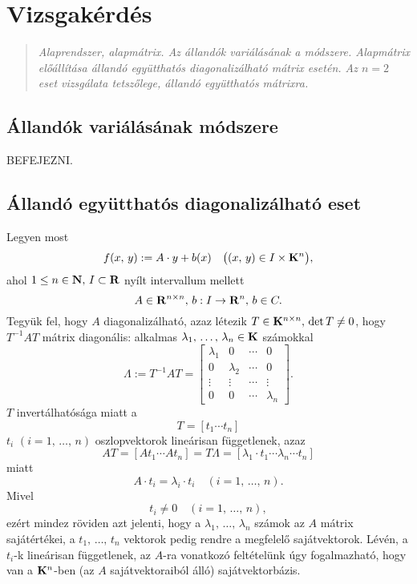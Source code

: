 \newpage
\section{Vizsgakérdés}
\begin{quote}
	\textit{Alaprendszer, alapmátrix. Az állandók variálásának a módszere. Alapmátrix előállítása állandó együtthatós diagonalizálható mátrix esetén. Az $n=2$ eset vizsgálata tetszőlege, állandó együtthatós mátrixra.}
\end{quote}

\subsection{Állandók variálásának módszere}
BEFEJEZNI.

\subsection{Állandó együtthatós diagonalizálható eset}

Legyen most
\[
f(x, \, y) := A \cdot y + b(x) \quad \big( (x, \, y) \in I \times \mathbf{K}^n \big),
\]
ahol $1 \leq n \in \mathbf{N}, \, I \subset \mathbf{R}$ nyílt intervallum mellett
\[
A \in \mathbf{R}^{n \times n}, \, b : I \to \mathbf{R}^n, \, b \in C.
\]
Tegyük fel, hogy $A$ diagonalizálható, azaz létezik $T \in \mathbf{K}^{n \times n}, \, \det T \neq 0$, hogy $T^{-1}AT$ mátrix diagonális: alkalmas $\lambda_1, \, \dots, \, \lambda_n \in \mathbf{K}$ számokkal
\[
\Lambda := T^{-1}AT = \begin{bmatrix}
	\lambda_1 & 0 & \cdots & 0 \\
	0 & \lambda_2 & \cdots & 0 \\
	\vdots & \vdots & \cdots & \vdots \\
	0 & 0 & \cdots & \lambda_n
\end{bmatrix}.
\]
$T$ invertálhatósága miatt a
\[
T = [t_1 \cdots t_n]
\]
$t_i$ $(i=1, \, \dots, \, n)$ oszlopvektorok lineárisan függetlenek, azaz
\[
AT = [At_1 \cdots At_n] = T\Lambda = [\lambda_1 \cdot t_1 \cdots \lambda_n \cdots t_n]
\]
miatt
\[
A \cdot t_i = \lambda_i \cdot t_i \quad (i = 1, \, \dots, \, n).
\]
Mivel
\[
t_i \neq 0 \quad (i = 1, \, \dots, \, n),
\]
ezért mindez röviden azt jelenti, hogy a $\lambda_1, \, \dots, \, \lambda_n$ számok az $A$ mátrix sajátértékei, a $t_1, \, \dots, \, t_n$ vektorok pedig rendre a megfelelő sajátvektorok. Lévén, a $t_i$-k lineárisan függetlenek, az $A$-ra vonatkozó feltételünk úgy fogalmazható, hogy van a $\mathbf{K}^n$-ben (az $A$ sajátvektoraiból álló) sajátvektorbázis.\\

